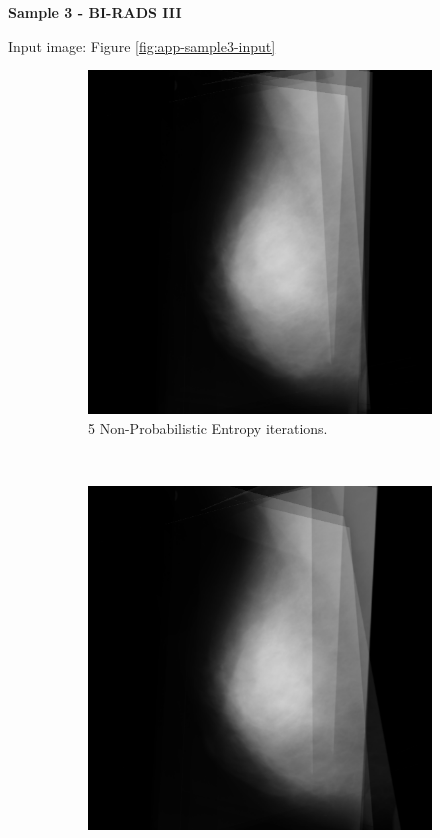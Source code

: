\newpage
\noindent \textbf{Sample 3 - BI-RADS III}

Input image: Figure \ref{fig:app-sample3-input}

\begin{figure}[H]
    \centering
    \begin{subfigure}[t]{0.3\textwidth}
        \includegraphics[width=\textwidth]{Appendix5/sample3/nonProb/5_scan.png}
        \caption{5 Non-Probabilistic Entropy iterations.}
        \label{fig:app-5-nonProb-sample3}
    \end{subfigure} \hfill
    ~ %
    \begin{subfigure}[t]{0.3\textwidth}
      \includegraphics[width=\textwidth]{Appendix5/sample3/nonProb/10_scan.png}

\end{subfigure}
\end{figure}
